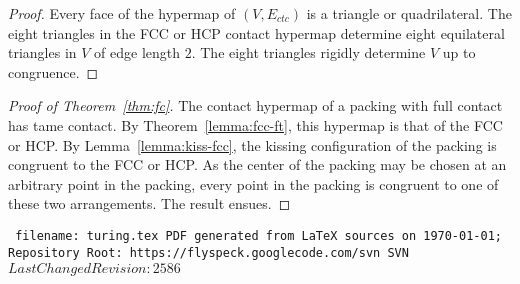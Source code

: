 \documentclass{llncs}
\def\svninfo{{\tt
  filename: turing.tex\hfill\break
  PDF generated from LaTeX sources on \today; \hfill\break
  Repository Root: https://flyspeck.googlecode.com/svn \hfill\break
  SVN $LastChangedRevision: 2586 $
  }
  }
\begin{document}
\begin{proof} Every face of the hypermap of $(V,E_{ctc})$ is a
  triangle or quadrilateral.  The eight triangles in the FCC or HCP
  contact hypermap determine eight equilateral triangles in $V$ of
  edge length $2$.  The eight triangles rigidly determine $V$ up to
  congruence.
\end{proof}

\begin{proof}[Proof of Theorem~\ref{thm:fc}]  %
  The contact hypermap of a packing with full contact has tame
  contact.  By Theorem~\ref{lemma:fcc-ft}, this hypermap is that of
  the FCC or HCP.  By Lemma~\ref{lemma:kiss-fcc}, the kissing
  configuration of the packing is congruent to the FCC or HCP.  As the
  center of the packing may be chosen at an arbitrary point in the
  packing, every point in the packing is congruent to one of these two
  arrangements.  The result ensues.
\end{proof}



\raggedright



\bigskip
\noindent
\svninfo
\smallskip

\noindent
\endnote
\end{document}
